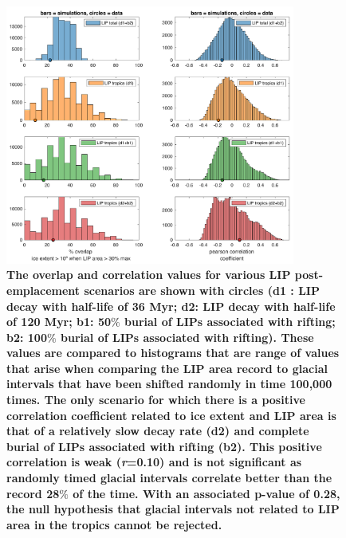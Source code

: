 \documentclass[11pt,letterpaper]{article}
\begin{document}
\begin{figure}[h!]
\begin{center}
	\includegraphics[width=0.85\textwidth]{Manuscript/Figures/overlap_correlation_cropped.pdf}
	\caption{\textbf{The overlap and correlation values for various LIP post-emplacement scenarios are shown with circles (d1 : LIP decay with half-life of 36 Myr; d2: LIP decay with half-life of 120 Myr; b1: 50$\%$ burial of LIPs associated with rifting; b2: 100$\%$ burial of LIPs associated with rifting). These values are compared to histograms that are range of values that arise when comparing the LIP area record to glacial intervals that have been shifted randomly in time 100,000 times. The only scenario for which there is a positive correlation coefficient related to ice extent and LIP area is that of a relatively slow decay rate (d2) and complete burial of LIPs associated with rifting (b2). This positive correlation is weak (\textit{r}=0.10) and is not significant as randomly timed glacial intervals correlate better than the record 28$\%$ of the time. With an associated p-value of 0.28, the null hypothesis that glacial intervals not related to LIP area in the tropics cannot be rejected.}}
	\label{fig:LIP_correlation}
\end{center}
\end{figure}



\clearpage
\newpage
\footnotesize

\singlespacing



\end{document}
